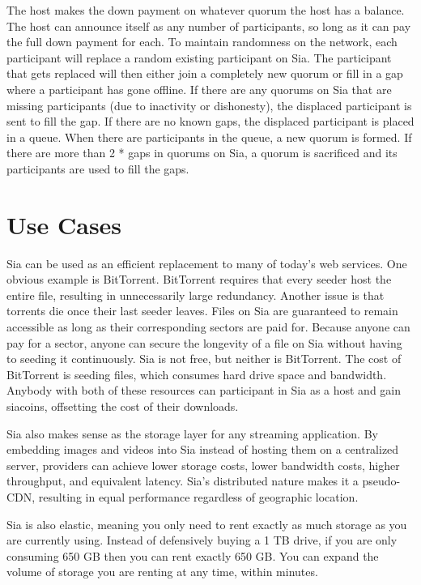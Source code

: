 \documentclass[twocolumn]{article}
\begin{document}
The host makes the down payment on whatever quorum the host has a balance.
The host can announce itself as any number of participants, so long as it can pay the full down payment for each.
To maintain randomness on the network, each participant will replace a random existing participant on Sia.
The participant that gets replaced will then either join a completely new quorum or fill in a gap where a participant has gone offline.
If there are any quorums on Sia that are missing participants (due to inactivity or dishonesty), the displaced participant is sent to fill the gap.
If there are no known gaps, the displaced participant is placed in a queue.
When there are \quorumsize{} participants in the queue, a new quorum is formed.
If there are more than 2 * \quorumsize{} gaps in quorums on Sia, a quorum is sacrificed and its participants are used to fill the gaps.


\section{Use Cases}
Sia can be used as an efficient replacement to many of today's web services.
One obvious example is BitTorrent.
BitTorrent requires that every seeder host the entire file, resulting in unnecessarily large redundancy.
Another issue is that torrents die once their last seeder leaves.
Files on Sia are guaranteed to remain accessible as long as their corresponding sectors are paid for.
Because anyone can pay for a sector, anyone can secure the longevity of a file on Sia without having to seeding it continuously.
Sia is not free, but neither is BitTorrent.
The cost of BitTorrent is seeding files, which consumes hard drive space and bandwidth.
Anybody with both of these resources can participant in Sia as a host and gain siacoins, offsetting the cost of their downloads.

Sia also makes sense as the storage layer for any streaming application.
By embedding images and videos into Sia instead of hosting them on a centralized server, providers can achieve lower storage costs, lower bandwidth costs, higher throughput, and equivalent latency.
Sia's distributed nature makes it a pseudo-CDN, resulting in equal performance regardless of geographic location.

Sia is also elastic, meaning you only need to rent exactly as much storage as you are currently using.
Instead of defensively buying a 1 TB drive, if you are only consuming 650 GB then you can rent exactly 650 GB.
You can expand the volume of storage you are renting at any time, within minutes.
\end{document}
